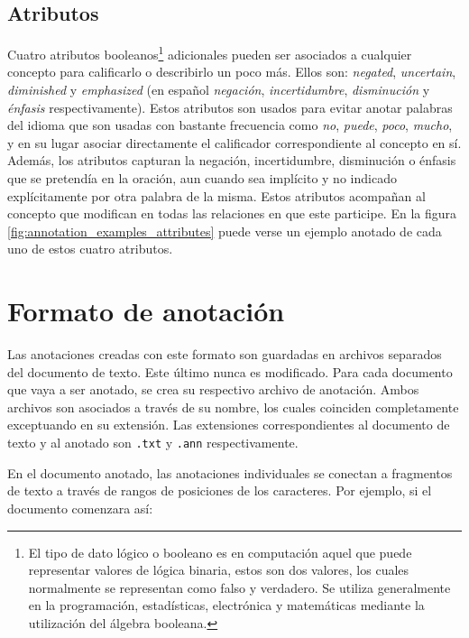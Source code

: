 \subsection{Atributos}\label{section:attributes}
Cuatro atributos booleanos\footnote{El tipo de dato lógico o booleano es en computación aquel que puede representar valores de lógica binaria, estos son dos valores, los cuales normalmente se representan como falso y verdadero. Se utiliza generalmente en la programación, estadísticas, electrónica y matemáticas mediante la utilización del álgebra booleana.} adicionales pueden ser asociados a cualquier concepto para calificarlo o describirlo un poco más. Ellos son: \textit{negated}, \textit{uncertain}, \textit{diminished} y \textit{emphasized} (en español \textit{negación}, \textit{incertidumbre}, \textit{disminución} y \textit{énfasis} respectivamente). Estos atributos son usados para evitar anotar palabras del idioma que son usadas con bastante frecuencia como \textit{no}, \textit{puede}, \textit{poco}, \textit{mucho}, y en su lugar asociar directamente el calificador correspondiente al concepto en sí. Además, los atributos capturan la negación, incertidumbre, disminución o énfasis que se pretendía en la oración, aun cuando sea implícito y no indicado explícitamente por otra palabra de la misma. Estos atributos acompañan al concepto que modifican en todas las relaciones en que este participe. En la figura \ref{fig:annotation_examples_attributes} puede verse un ejemplo anotado de cada uno de estos cuatro atributos.

\section{Formato de anotación}
\label{section:annotation_file_format}
Las anotaciones creadas con este formato son guardadas en archivos separados del documento de texto. Este último nunca es modificado. Para cada documento que vaya a ser anotado, se crea su respectivo archivo de anotación. Ambos archivos son asociados a través de su nombre, los cuales coinciden completamente exceptuando en su extensión. Las extensiones correspondientes al documento de texto y al anotado son \texttt{.txt} y \texttt{.ann} respectivamente.

En el documento anotado, las anotaciones individuales se conectan a fragmentos de texto a través de rangos de posiciones de los caracteres. Por ejemplo, si el documento comenzara así:

\begin{center}
\end{center}

